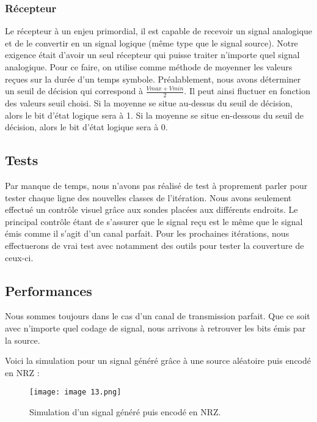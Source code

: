 \subsubsection{Récepteur}

Le récepteur à un enjeu primordial, il est capable de recevoir un signal analogique et de le convertir en un signal logique (même type que le signal source). Notre exigence était d'avoir un seul récepteur qui puisse traiter n'importe quel signal analogique.
Pour ce faire, on utilise comme méthode de moyenner les valeurs reçues sur la durée d'un temps symbole. Préalablement, nous avons déterminer un seuil de décision qui correspond à $\frac{Vmax + Vmin}{2}$.
Il peut ainsi fluctuer en fonction des valeurs seuil choisi. Si la moyenne se situe au-dessus du seuil de décision, alors le bit d'état logique sera à 1. Si la moyenne se situe en-dessous du seuil de décision, alors le bit d'état logique sera à 0.

\subsection{Tests}

Par manque de temps, nous n'avons pas réalisé de test à proprement parler pour tester chaque ligne des nouvelles classes de l'itération. Nous avons seulement effectué un contrôle visuel grâce aux sondes placées aux différents endroits. Le principal contrôle étant de s'assurer que le signal reçu est le même que le signal émis comme il s'agit d'un canal parfait.
Pour les prochaines itérations, nous effectuerons de vrai test avec notamment des outils pour tester la couverture de ceux-ci.

\subsection{Performances}

Nous sommes toujours dans le cas d'un canal de transmission parfait. Que ce soit avec n'importe quel codage de signal, nous arrivons à retrouver les bits émis par la source.

Voici la simulation pour un signal généré grâce à une source aléatoire puis encodé en NRZ :

\begin{figure}[h]
    \centering
    \texttt{[image: image 13.png]}
    \caption{\label{fig:image13}Simulation d'un signal généré puis encodé en NRZ.}
\end{figure}

